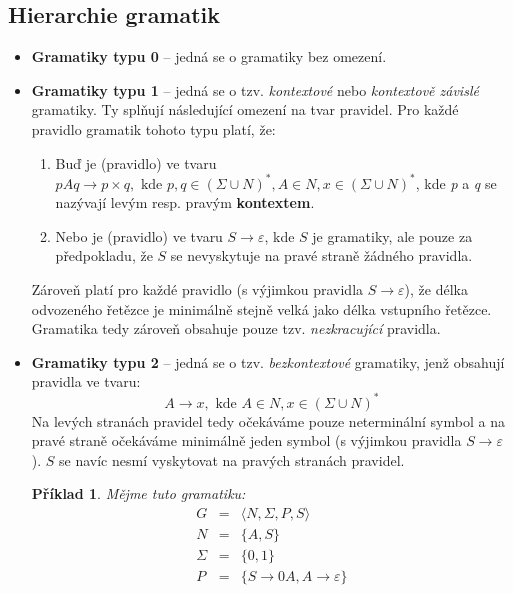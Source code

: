 \documentclass[10pt, a4paper, titlepage]{article}
\theoremstyle{note}
\newtheorem{priklad}{Příklad}
\begin{document}
\subsection{Hierarchie gramatik}
\begin{itemize}
\item
\textbf{Gramatiky typu 0} -- jedná se o gramatiky bez omezení.

\item
\textbf{Gramatiky typu 1\label{gram-1}} -- jedná se o tzv. \emph{kontextové} nebo \emph{kontextově závislé} gramatiky.
Ty splňují následující omezení na tvar pravidel. Pro každé pravidlo gramatik tohoto typu platí, že:
\begin{enumerate}
\item
Buď je (pravidlo) ve tvaru $pAq \rightarrow p \times q, \text{ kde } p, q \in (\Sigma \cup N)^{*}, A \in N, x \in (\Sigma \cup N)^{*}$, kde \emph{p} a \emph{q}
se nazývají levým resp. pravým \textbf{kontextem}.

\item
Nebo je (pravidlo) ve tvaru $S \rightarrow \varepsilon$, kde $S$ je  gramatiky, ale pouze
za předpokladu, že $S$ se nevyskytuje na pravé straně žádného pravidla.
\end{enumerate}

Zároveň platí pro každé pravidlo (s výjimkou pravidla $S \rightarrow \varepsilon$), že délka odvozeného řetězce je minimálně stejně velká jako délka vstupního řetězce. Gramatika tedy zároveň obsahuje pouze tzv. \emph{nezkracující} pravidla.

\item
\textbf{Gramatiky typu 2} -- jedná se o tzv. \emph{bezkontextové} gramatiky, jenž obsahují pravidla ve tvaru:
$$
A \rightarrow x, \text{ kde } A \in N, x \in (\Sigma \cup N)^{*}
$$
Na levých stranách pravidel tedy očekáváme pouze neterminální symbol a na pravé straně očekáváme minimálně jeden symbol (s výjimkou pravidla $S \rightarrow \varepsilon$). $S$ se navíc nesmí vyskytovat na pravých stranách pravidel.

\begin{priklad}
Mějme tuto gramatiku:
\begin{eqnarray*}
G &=& \langle N, \Sigma, P, S \rangle \\
N &=& \lbrace A, S \rbrace \\
\Sigma &=& \lbrace 0, 1 \rbrace \\
P &=& \lbrace S \rightarrow 0A, A \rightarrow \varepsilon \rbrace
\end{eqnarray*}
\end{priklad}


\end{itemize}
\end{document}
